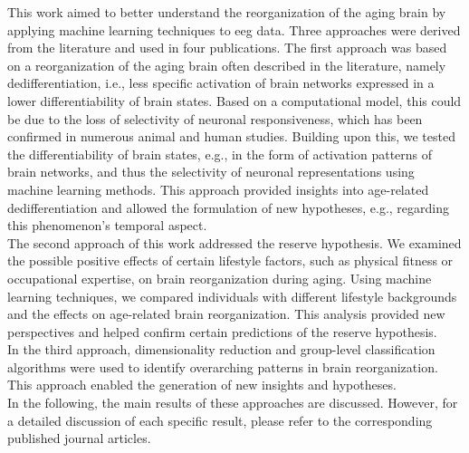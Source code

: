This work aimed to better understand the reorganization of the aging brain by applying machine learning techniques to \gls{eeg} data. Three approaches were derived from the literature and used in four publications.
The first approach was based on a reorganization of the aging brain often described in the literature, namely dedifferentiation, i.e., less specific activation of brain networks expressed in a lower differentiability of brain states. Based on a computational model, this could be due to the loss of selectivity of neuronal responsiveness, which has been confirmed in numerous animal and human studies. Building upon this, we tested the differentiability of brain states, e.g., in the form of activation patterns of brain networks, and thus the selectivity of neuronal representations using machine learning methods. This approach provided insights into age-related dedifferentiation and allowed the formulation of new hypotheses, e.g., regarding this phenomenon's temporal aspect.\\
The second approach of this work addressed the reserve hypothesis. We examined the possible positive effects of certain lifestyle factors, such as physical fitness or occupational expertise, on brain reorganization during aging. Using machine learning techniques, we compared individuals with different lifestyle backgrounds and the effects on age-related brain reorganization. This analysis provided new perspectives and helped confirm certain predictions of the reserve hypothesis.\\
In the third approach, dimensionality reduction and group-level classification algorithms were used to identify overarching patterns in brain reorganization. This approach enabled the generation of new insights and hypotheses.\\
In the following, the main results of these approaches are discussed. However, for a detailed discussion of each specific result, please refer to the corresponding published journal articles.\\


